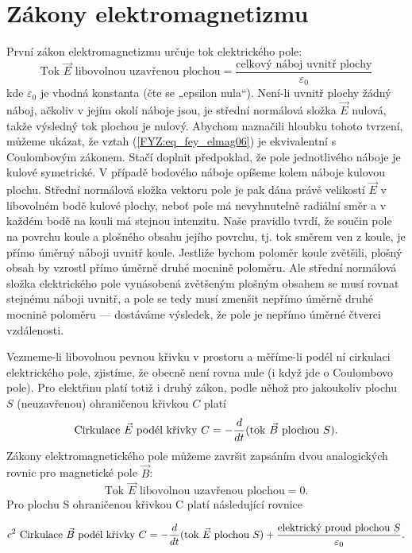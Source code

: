   \section{Zákony elektromagnetizmu}
    \cite[s.~17]{Feynman02} První zákon elektromagnetizmu určuje tok elektrického pole:
    \begin{equation}\label{FYZ:eq_fey_elmag06}
      \text{Tok }\vec{E}\text{ libovolnou uzavřenou plochou} 
        = \frac{\text{celkový náboj uvnitř plochy}}{\varepsilon_0}
    \end{equation}
    kde \(\varepsilon_0\) je vhodná konstanta (čte se „epsilon nula“). Není-li uvnitř plochy žádný náboj, 
    ačkoliv v jejím okolí náboje jsou, je střední normálová složka \(\vec{E}\) nulová, takže výsledný tok 
    plochou je nulový. Abychom naznačili hloubku tohoto tvrzení, můžeme ukázat, že vztah     
    (\ref{FYZ:eq_fey_elmag06}) je ekvivalentní s Coulombovým zákonem. Stačí doplnit předpoklad, že pole 
    jednotlivého náboje je kulové symetrické. V případě bodového náboje opíšeme kolem náboje kulovou 
    plochu. Střední normálová složka vektoru pole je pak dána právě velikostí \(\vec{E}\) v libovolném bodě 
    kulové plochy, neboť pole má nevyhnutelně radiální směr a v každém bodě na kouli má stejnou intenzitu. 
    Naše pravidlo tvrdí, že součin pole na povrchu koule a plošného obsahu jejího povrchu, tj. tok směrem 
    ven z koule, je přímo úměrný náboji uvnitř koule. Jestliže bychom poloměr koule zvětšili, plošný obsah 
    by vzrostl přímo úměrně druhé mocnině poloměru. Ale střední normálová složka elektrického pole 
    vynásobená zvětšeným plošným obsahem se musí rovnat stejnému náboji uvnitř, a pole se tedy musí zmenšit 
    nepřímo úměrně druhé mocnině poloměru — dostáváme výsledek, že pole je nepřímo úměrné čtverci 
    vzdálenosti.
    
    Vezmeme-li libovolnou pevnou křivku v prostoru a měříme-li podél ní cirkulaci elektrického pole,
    zjistíme, že obecně není rovna nule (i když jde o Coulombovo pole). Pro elektřinu platí totiž i druhý 
    zákon, podle něhož pro jakoukoliv plochu \(S\) (neuzavřenou) ohraničenou křivkou \(C\) platí
    \begin{equation}\label{FYZ:eq_fey_elmag07}
     \text{Cirkulace }\vec{E}\text{ podél křivky } C 
        = -\frac{d  }{d t}(\text{tok }\vec{B}\text{ plochou }S).
    \end{equation}
    Zákony elektromagnetického pole můžeme završit zapsáním dvou analogických rovnic pro magnetické pole 
    \(\vec{B}\):
    \begin{equation}\label{FYZ:eq_fey_elmag08}
     \text{Tok }\vec{E}\text{ libovolnou uzavřenou plochou} = 0.
    \end{equation}
    Pro plochu S ohraničenou křivkou C platí následující rovnice
    \begin{widetext}
      \begin{equation}\label{FYZ:eq_fey_elmag09}
        c^2\text{ Cirkulace }\vec{B}\text{ podél křivky } C 
          = -\frac{d  }{d t}(\text{tok }\vec{E}\text{ plochou }S)
            +\frac{\text{elektrický proud plochou }S}{\varepsilon_0}.
      \end{equation}
    \end{widetext}
    
